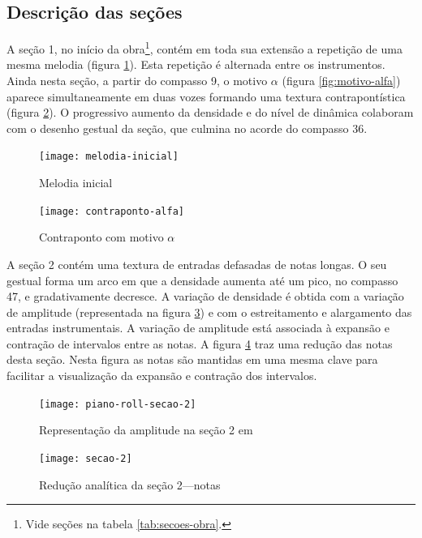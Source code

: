 \subsection{Descrição das seções}
\label{sec:descricao-das-secoes}

A seção 1, no início da obra\footnote{Vide seções na tabela
  \ref{tab:secoes-obra}.}, contém em toda sua extensão a repetição de
uma mesma melodia (figura \ref{fig:melodia-inicial}). Esta repetição é
alternada entre os instrumentos. Ainda nesta seção, a partir do
compasso 9, o motivo $\alpha$ (figura \ref{fig:motivo-alfa}) aparece
simultaneamente em duas vozes formando uma textura contrapontística
(figura \ref{fig:contraponto-alfa}). O progressivo aumento da
densidade e do nível de dinâmica colaboram com o desenho gestual da
seção, que culmina no acorde do compasso 36.

\begin{figure}
  \centering
  \texttt{[image: melodia-inicial]}
  \caption{Melodia inicial}
  \label{fig:melodia-inicial}
\end{figure}

\begin{figure}[!t]
  \centering
  \texttt{[image: contraponto-alfa]}
  \caption{Contraponto com motivo $\alpha$}
  \label{fig:contraponto-alfa}
\end{figure}

A seção 2 contém uma textura de entradas defasadas de notas longas. O
seu gestual forma um arco em que a densidade aumenta até um pico, no
compasso 47, e gradativamente decresce. A variação de densidade é
obtida com a variação de amplitude (representada na figura
\ref{fig:amplitude-secao-2}) e com o estreitamento e alargamento das
entradas instrumentais. A variação de amplitude está associada à
expansão e contração de intervalos entre as notas. A figura
\ref{fig:notas-secao-2} traz uma redução das notas desta seção. Nesta
figura as notas são mantidas em uma mesma clave para facilitar a
visualização da expansão e contração dos intervalos.

\begin{figure}
  \centering
  \texttt{[image: piano-roll-secao-2]}
  \caption{Representação da amplitude na seção 2 em }
  \label{fig:amplitude-secao-2}
\end{figure}

\begin{figure}
  \centering
  \texttt{[image: secao-2]}
  \caption{Redução analítica da seção 2---notas}
  \label{fig:notas-secao-2}
\end{figure}

